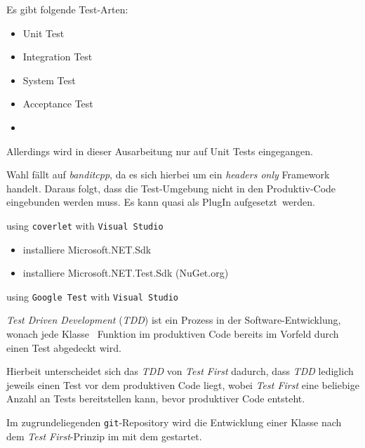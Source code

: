 


Es gibt folgende Test-Arten:
\begin{itemize}
\item Unit Test
\item Integration Test
\item System Test
\item Acceptance Test
\item {}
\end{itemize}


Allerdings wird in dieser Ausarbeitung nur auf Unit Tests eingegangen.








Wahl fällt auf \textit{banditcpp}, da es sich hierbei um ein \textit{headers only} Framework handelt.
Daraus folgt, dass die Test-Umgebung nicht in den Produktiv-Code eingebunden werden muss. Es kann quasi als PlugIn \glqq aufgesetzt\grqq\ werden.














using \texttt{coverlet} with \texttt{Visual Studio}



\begin{itemize}
\item installiere Microsoft.NET.Sdk
\item installiere Microsoft.NET.Test.Sdk (NuGet.org)



\end{itemize}


using \texttt{Google Test} with \texttt{Visual Studio}






\textit{Test Driven Development} (\textit{TDD}) ist ein Prozess in der Software-Entwicklung, wonach jede Klasse \bzw\ Funktion im produktiven Code bereits im Vorfeld durch einen Test abgedeckt wird.

Hierbeit unterscheidet sich das \textit{TDD} von \textit{Test First} dadurch, dass \textit{TDD} lediglich jeweils einen Test vor dem produktiven Code liegt, wobei \textit{Test First} eine beliebige Anzahl an Tests bereitstellen kann, bevor produktiver Code entsteht. 

Im zugrundeliegenden \texttt{git}-Repository wird die Entwicklung einer Klasse nach dem \textit{Test First}-Prinzip im  mit dem  gestartet.

